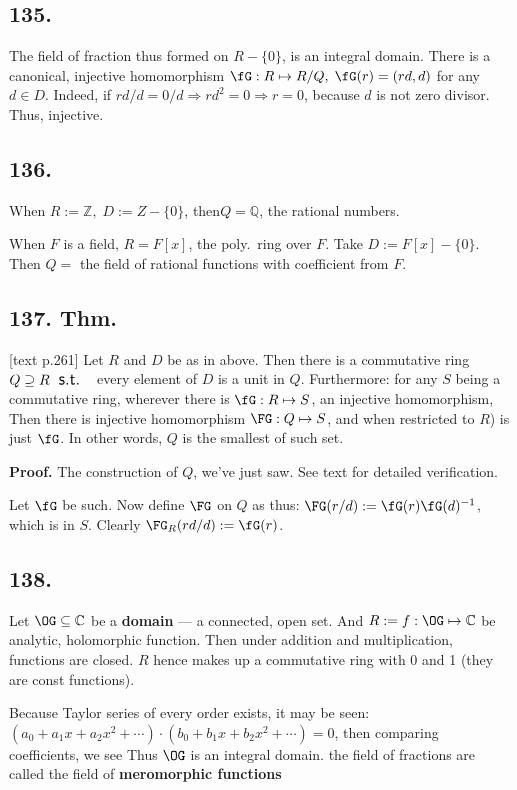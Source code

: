 \documentclass[12pt]{article}
\newcommand\M\cdot%
\newcommand\Mp\mapsto%
\newcommand\St{\textsf{\large \: s.t. \:}}%
\newcommand{\Ip}{\Rightarrow} %
\newcommand{\BF}[1]{ \mathbb{#1} }%
\newcommand{\Ss}[1]{\textsf{\bfseries{#1}}}%
\begin{document}
\subsection*{135.} The field of fraction thus formed on \(R- \{0\}\), is an integral domain. 
There is a canonical, injective homomorphism \(\fG: R \Mp R/Q,\; \fG(r) = (rd, d)\) for any \(d \in D\). 
Indeed, if \(rd/d = 0/d \Ip rd^2=0 \Ip r=0\), because \(d\) is not zero divisor. 
Thus, injective. 

\subsection*{136.} When \(R := \BF Z,\; D := Z - \{0\}\), then\(Q = \BF Q\), the rational numbers. \par
When \(F\) is a field, \(R = F[x]\), the poly.\ ring over \(F\). 
Take \(D:= F[x] - \{0\}\). 
Then \(Q =\) the field of rational functions with coefficient from \(F\). 

\subsection*{137. Thm.} [text p.261] Let \(R\) and \(D\) be as in above. 
Then there is a commutative ring \(Q \supseteq R \St\) every element of \(D\) is a unit in \(Q\). 
Furthermore: for any \(S\) being a commutative ring, 
wherever there is \(\fG: R \Mp S\), an injective homomorphism, 
Then there is injective homomorphism \(\FG: Q \Mp S\), 
and when restricted to \(R\)) is just \(\fG\). 
In other words, \(Q\) is the smallest of such set. \par
\Ss{Proof.} The construction of \(Q\), we've just saw. See text for detailed verification. \par
Let \(\fG\) be such. 
Now define \(\FG\) on \(Q\) as thus: \(\FG(r/d) := \fG(r) \fG(d)^{-1}\), which is in \(S\). 
Clearly \(\FG_R (rd/d) := \fG(r)\). 

\subsection*{138.} Let \(\OG \subseteq \BF C\) be a \Ss{domain} --- a connected, open set. 
And \(R:= {f: \OG \Mp \BF C }\) be analytic, holomorphic function. 
Then under addition and multiplication, functions are closed. 
\(R\) hence makes up a commutative ring with 0 and 1 (they are const functions). \par
Because Taylor series of every order exists, it may be seen: \((a_0 + a_1 x + a_2 x^2 +\dotsb) \M (b_0 + b_1 x + b_2 x^2 +\dotsb) = 0\), 
then comparing coefficients, we see  
Thus \(\OG\) is an integral domain. 
the field of fractions are called the field of \Ss{meromorphic functions}
\end{document}
